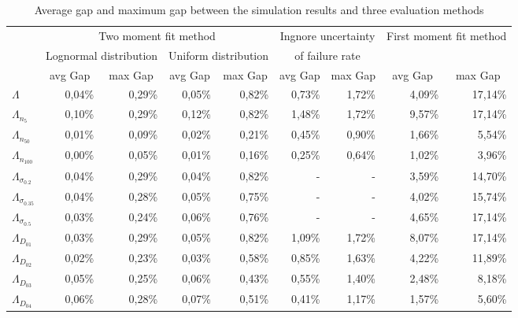 \documentclass[preprint,12pt]{elsarticle}
\begin{document}
\begin{table}[htbp]
\small
  \centering
  \caption{Average gap and maximum gap between the simulation results and three evaluation methods}
    \begin{tabular}{lrrrrrrrr}
    \toprule
    \small
          & \multicolumn{4}{c}{Two moment fit method} & \multicolumn{2}{c}{Ingnore uncertainty } & \multicolumn{2}{c}{First moment fit method} \\
          & \multicolumn{2}{c}{Lognormal distribution} & \multicolumn{2}{c}{Uniform distribution} &  \multicolumn{2}{c}{of failure rate}     &       &  \\
          & \multicolumn{1}{c}{avg Gap} & \multicolumn{1}{c}{max Gap} & \multicolumn{1}{c}{avg Gap} & \multicolumn{1}{c}{max Gap} & \multicolumn{1}{c}{avg Gap} & \multicolumn{1}{c}{max Gap} & \multicolumn{1}{c}{avg Gap} & \multicolumn{1}{c}{max Gap} \\
    \midrule
    \normalsize
    $\Lambda$ & 0,04\% & 0,29\% & 0,05\% & 0,82\% & 0,73\% & 1,72\% & 4,09\% & 17,14\% \\
    $\Lambda_{n_{5}}$ & 0,10\% & 0,29\% & 0,12\% & 0,82\% & 1,48\% & 1,72\% & 9,57\% & 17,14\% \\
    $\Lambda_{n_{50}}$ & 0,01\% & 0,09\% & 0,02\% & 0,21\% & 0,45\% & 0,90\% & 1,66\% & 5,54\% \\
    $\Lambda_{n_{100}}$ & 0,00\% & 0,05\% & 0,01\% & 0,16\% & 0,25\% & 0,64\% & 1,02\% & 3,96\% \\
    $\Lambda_{\sigma_{0.2}}$ & 0,04\% & 0,29\% & 0,04\% & 0,82\% & -     & -     & 3,59\% & 14,70\% \\
    $\Lambda_{\sigma_{0.35}}$ & 0,04\% & 0,28\% & 0,05\% & 0,75\% & -     & -     & 4,02\% & 15,74\% \\
    $\Lambda_{\sigma_{0.5}}$ & 0,03\% & 0,24\% & 0,06\% & 0,76\% & -     & -     & 4,65\% & 17,14\% \\
     $\Lambda_{D_{01}}$  & 0,03\% & 0,29\% & 0,05\% & 0,82\% & 1,09\% & 1,72\% & 8,07\% & 17,14\% \\
     $\Lambda_{D_{02}}$  & 0,02\% & 0,23\% & 0,03\% & 0,58\% & 0,85\% & 1,63\% & 4,22\% & 11,89\% \\
     $\Lambda_{D_{03}}$  & 0,05\% & 0,25\% & 0,06\% & 0,43\% & 0,55\% & 1,40\% & 2,48\% & 8,18\% \\
     $\Lambda_{D_{04}}$  & 0,06\% & 0,28\% & 0,07\% & 0,51\% & 0,41\% & 1,17\% & 1,57\% & 5,60\% \\
    \bottomrule
    \end{tabular}%
  \label{generalapptable}%
\end{table}%
\end{document}
